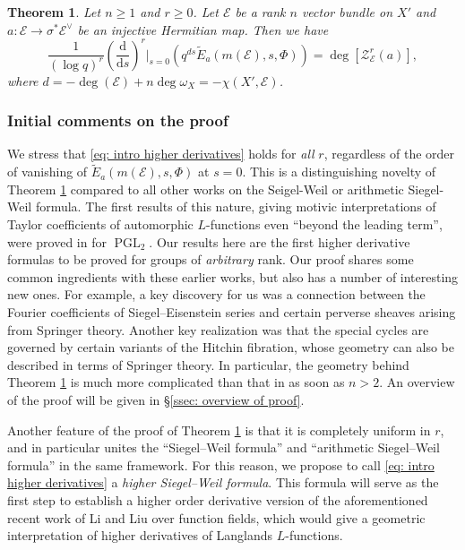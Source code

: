 \documentclass[reqno]{amsart}
\numberwithin{equation}{section}
\newcommand{\wt}[1]{\widetilde{#1}}
\newcommand{\co}{\colon}
\newcommand{\mrm}[1]{\mathrm{#1}}
\DeclareMathOperator{\PGL}{PGL}
\newcommand\sss{\subsubsection}
\newcommand\cE{\mathcal{E}}
\newcommand\cZ{\mathcal{Z}}
\newcommand\dds{\frac{\mrm{d}}{\mrm{d}s}}
\newtheorem{thm}{Theorem}[section]
\theoremstyle{remark}
\numberwithin{equation}{section}
\begin{document}
\begin{thm}\label{th:intro} Let $n \geq 1$ and $r \geq 0$. Let $\cE$ be a rank $n$ vector bundle on $X'$ and $a \co \cE \rightarrow \sigma^*  \cE^{\vee}$ be an injective Hermitian map. Then we have
\begin{equation}\label{eq: intro higher derivatives}
\frac{1}{(\log q)^r}  \left(\dds \right)^r\Big|_{s=0} \left( q^{ds} \wt{E}_{a}(m(\cE),s,\Phi) \right)  =  \deg [\cZ_{\cE}^r(a)],
\end{equation}
where $d=-\deg(\cE)+n\deg\omega_X =-\chi(X',\cE)$.
\end{thm}



\sss{Initial comments on the proof} We stress that \eqref{eq: intro higher derivatives} holds for \emph{all} $r$, regardless of the order of vanishing of $\wt{E}_{a}(m(\cE),s,\Phi)$ at $s=0$. This is a distinguishing novelty of Theorem \ref{th:intro} compared to all other works on the Seigel-Weil or arithmetic Siegel-Weil formula. The first results of this nature, giving motivic interpretations of Taylor coefficients of automorphic $L$-functions even ``beyond the leading term'', were proved in \cite{YZ, YZII} for $\PGL_2$. Our results here are the first higher derivative formulas to be proved for groups of \emph{arbitrary} rank. Our proof shares some common ingredients with these earlier works, but also has a number of interesting new ones. For example, a key discovery for us was a connection between the Fourier coefficients of Siegel--Eisenstein series and certain perverse sheaves arising from Springer theory. Another key realization was that the special cycles are governed by certain variants of the Hitchin fibration, whose geometry can also be described in terms of Springer theory. In particular, the geometry behind Theorem \ref{th:intro} is much more complicated than that in \cite{YZ, YZII} as soon as $n>2$. An overview of the proof will be given in \S \ref{ssec: overview of proof}.

Another feature of the proof of Theorem \ref{th:intro} is that it is completely uniform in $r$, and in particular unites the ``Siegel--Weil formula'' and ``arithmetic Siegel--Weil formula'' in the same framework. For this reason, we propose to call \eqref{eq: intro higher derivatives} a {\em higher Siegel--Weil formula}. This formula will serve as the first step to establish a higher order derivative version of the aforementioned recent work of Li and Liu \cite{LL1,LL2} over function fields, which would give a geometric interpretation of higher derivatives of Langlands $L$-functions.
\end{document}
